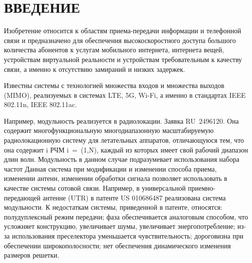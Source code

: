 \documentclass[utf8x, 14pt, oneside, a4paper]{article}
\begin{document}
	
	\pagebreak
	
	\section*{ВВЕДЕНИЕ}
	Изобретение относится к областям приема-передачи информации и телефонной связи и предназначено для обеспечения высокоскоростного доступа большого количества абонентов к услугам мобильного интернета, интернета вещей, устройствам виртуальной реальности и устройствам требовательным к качеству связи, а именно к отсутствию замираний и низких задержек.
	
	Известны системы с технологией множества входов и множества выходов (MIMO), реализуемых в системах LTE, 5G, Wi-Fi, а именно в стандартах IEEE 802.11n, IEEE 802.11ac.
	
	Например, модульность реализуется в радиолокации. Заявка RU~2496120. Она содержит многофункциональную многодиапазонную масштабируемую радиолокационную систему для летательных аппаратов, отличающуюся тем, что она содержит i РЧМ i~=~(1,N), каждый из которых имеет свой рабочий диапазон длин волн. Модульность в данном случае подразумевает использования набора частот 
	Данная система при модификации и изменении способа приема, изменении антенн, изменении обработки сигнала позволяет использовать в качестве системы сотовой связи.
	Например, в универсальной приемно-передающей антенне (UTR) в патенте US 010686487 реализована система модульности. К недостаткам системы, приведенной в патенте, относятся: 
	полудуплексный режим передачи; 
	фаза обеспечивается аналоговым способом, что усложняет конструкцию, увеличивает шумы, увеличивает энергопотребление;
	из-за использования преселектора уменьшается чувствительность;
	дороговизна при обеспечении широкополосности;
	нет обеспечения динамического изменения размеров решетки. 
	
\end{document}
